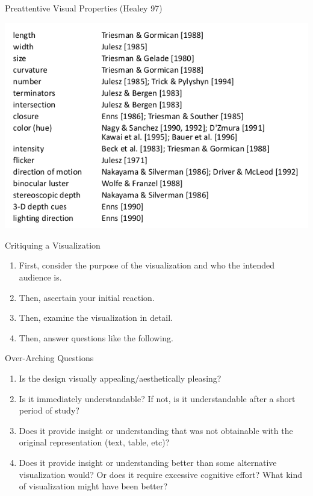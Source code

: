 \documentclass{beamer}
\begin{document}
\begin{frame}{Preattentive Visual Properties (Healey 97)}
    \begin{center}
        \includegraphics[scale=0.3]{preattentiveVisProperties.png}
    \end{center}
\end{frame}  

\begin{frame}{Critiquing a Visualization} 
    \begin{enumerate}
        \item First, consider the purpose of the visualization and who the intended audience is.
        \item Then, ascertain your initial reaction.
        \item Then, examine the visualization in detail.
        \item Then, answer questions like the following.
    \end{enumerate}
\end{frame}  

\begin{frame}{Over-Arching Questions} 
    \begin{enumerate}
        \item Is the design visually appealing/aesthetically pleasing?
        \item Is it immediately understandable? If not, is it understandable after a short period of study?
        \item Does it provide insight or understanding that was not obtainable with the original representation (text, table, etc)?
        \item Does it provide insight or understanding better than some alternative visualization would? Or does it require excessive cognitive effort? What kind of visualization might have been better?
    \end{enumerate}
\end{frame}  
\end{document}
